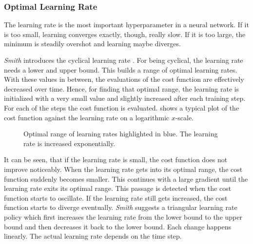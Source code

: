 \subsubsection{Optimal Learning Rate}
\label{sec:improving-performance-learning-rate}
The learning rate is the most important hyperparameter in a neural network.
If it is too small, learning converges exactly, though, really slow.
If it is too large, the minimum is steadily overshot and learning maybe diverges.

\textit{Smith} introduces the cyclical learning rate \cite{DBLP:journals/corr/Smith15a}.
For being cyclical, the learning rate needs a lower and upper bound.
This builds a range of optimal learning rates.
With these values in between, the evaluations of the cost function are effectively decreased over time.
Hence, for finding that optimal range, the learning rate is initialized with a very small value and slightly increased after each training step.
For each of the steps the cost function is evaluated.
 shows a typical plot of the cost function against the learning rate on a logarithmic $x$-scale.
\begin{figure}
	\setlength{}
	\setlength{}
	\centering
	
	\caption[Optimal range of learning rates]{Optimal range of learning rates highlighted in blue. The learning rate is increased exponentially.}
	\label{fig:optimal-learning-rate-range}
\end{figure}
It can be seen, that if the learning rate is small, the cost function does not improve noticeably.
When the learning rate gets into its optimal range, the cost function suddenly becomes smaller.
This continues with a large gradient until the learning rate exits its optimal range.
This passage is detected when the cost function starts to oscillate.
If the learning rate still gets increased, the cost function starts to diverge eventually.
\textit{Smith} suggests a triangular learning rate policy which first increases the learning rate from the lower bound to the upper bound and then decreases it back to the lower bound.
Each change happens linearly.
The actual learning rate depends on the time step.


